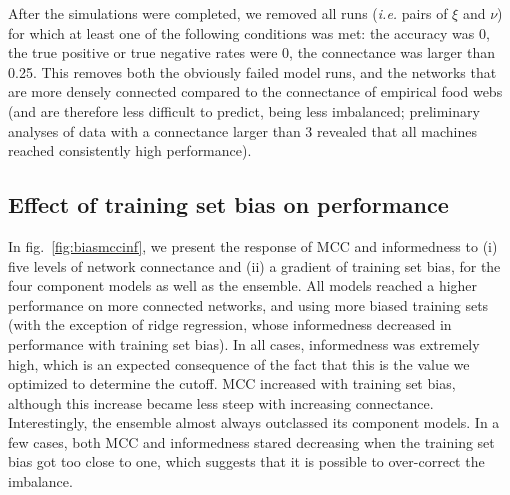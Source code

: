 \documentclass[11pt]{article}
\begin{document}
After the simulations were completed, we removed all runs (\emph{i.e.}
pairs of \(\xi\) and \(\nu\)) for which at least one of the following
conditions was met: the accuracy was 0, the true positive or true
negative rates were 0, the connectance was larger than 0.25. This
removes both the obviously failed model runs, and the networks that are
more densely connected compared to the connectance of empirical food
webs (and are therefore less difficult to predict, being less
imbalanced; preliminary analyses of data with a connectance larger than
3 revealed that all machines reached consistently high performance).

\hypertarget{effect-of-training-set-bias-on-performance}{%
\subsection{Effect of training set bias on
performance}\label{effect-of-training-set-bias-on-performance}}

In fig.~\ref{fig:biasmccinf}, we present the response of MCC and
informedness to (i) five levels of network connectance and (ii) a
gradient of training set bias, for the four component models as well as
the ensemble. All models reached a higher performance on more connected
networks, and using more biased training sets (with the exception of
ridge regression, whose informedness decreased in performance with
training set bias). In all cases, informedness was extremely high, which
is an expected consequence of the fact that this is the value we
optimized to determine the cutoff. MCC increased with training set bias,
although this increase became less steep with increasing connectance.
Interestingly, the ensemble almost always outclassed its component
models. In a few cases, both MCC and informedness stared decreasing when
the training set bias got too close to one, which suggests that it is
possible to over-correct the imbalance.
\end{document}
